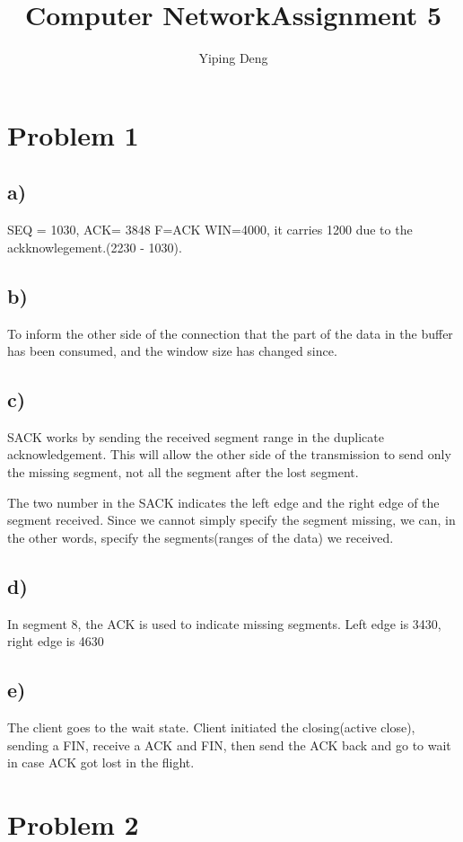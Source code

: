 \documentclass{article}
\newcommand{\coursename}{Computer Network}
\newcommand{\hwnumber}{5}
\begin{document}
\title{\coursename \thinspace Assignment \hwnumber}
\author{Yiping Deng}
\maketitle
\thispagestyle{fancy}

\section*{Problem 1}
\subsection*{a)}
SEQ = 1030, ACK= 3848 F=ACK WIN=4000, it carries 1200 due to the
ackknowlegement.(2230 - 1030).

\subsection*{b)}
To inform the other side of the connection that the part of the data in the
buffer has been consumed, and the window size has changed since.

\subsection*{c)}
SACK works by sending the received segment range in the duplicate
acknowledgement. This will allow the other side of the transmission to send only
the missing segment, not all the segment after the lost segment.

The two number in the SACK indicates the left edge and the right edge of the
segment received. Since we cannot simply specify the segment missing, we can, in
the other words, specify the segments(ranges of the data) we received.

\subsection*{d)}
In segment 8, the ACK is used to indicate missing segments. Left edge is 3430,
right edge is 4630
\subsection*{e)}
The client goes to the wait state. Client initiated the closing(active close),
sending a FIN, receive a ACK and FIN, then send the ACK back and go to wait in
case ACK got lost in the flight.

\section*{Problem 2}
\end{document}
